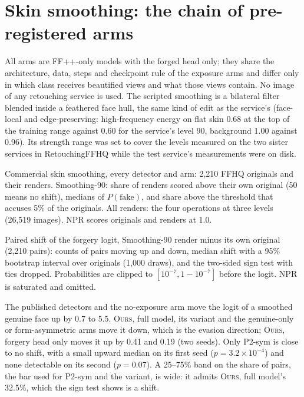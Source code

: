 \documentclass[10pt]{article}
\newcommand{\oursB}{\textsc{Ours}, forgery head only}
\newcommand{\oursF}{\textsc{Ours}, full model}
\begin{document}
\section{Skin smoothing: the chain of pre-registered arms}
\label{sec:chain}
All arms are FF++-only models with the forged head only; they share the architecture, data, steps and checkpoint rule of the
exposure arms and differ only in which class receives beautified views and what those views contain. No image of any retouching
service is used. The scripted smoothing is a bilateral filter blended inside a feathered face hull, the same kind of edit as the
service's (face-local and edge-preserving: high-frequency energy on flat skin 0.68 at the top of the training range against 0.60
for the service's level 90, background 1.00 against 0.96). Its strength range was set to cover the levels measured on the two
sister services in RetouchingFFHQ while the test service's measurements were on disk.

\begin{table}[H]
\centering
\caption{Commercial skin smoothing, every detector and arm: 2,210 FFHQ originals and their renders. Smoothing-90: share of renders
scored above their own original (50 means no shift), medians of $P(\text{fake})$, and share above the threshold that accuses 5\% of
the originals. All renders: the four operations at three levels (26,519 images). NPR scores originals and renders at 1.0.}
\label{tab:v4retouch}\label{tab:retouch}
\scriptsize
\begin{adjustbox}{max width=\linewidth}\end{adjustbox}
\end{table}
\begin{table}[H]
\centering
\caption{Paired shift of the forgery logit, Smoothing-90 render minus its own original (2,210 pairs): counts of pairs moving up and
down, median shift with a 95\% bootstrap interval over originals (1,000 draws), and the two-sided sign test with ties dropped.
Probabilities are clipped to $[10^{-7}, 1-10^{-7}]$ before the logit. NPR is saturated and omitted.}
\label{tab:shiftall}
\footnotesize

\end{table}
The published detectors and the no-exposure arm move the logit of a smoothed genuine face up by 0.7 to 5.5. \oursF{}, its variant
and the genuine-only or form-asymmetric arms move it down, which is the evasion direction; \oursB{} moves it up by 0.41 and 0.19
(two seeds). Only P2-sym is close to no shift, with a small upward median on its first seed ($p=3.2\times10^{-4}$) and none detectable on
its second ($p=0.07$). A 25--75\% band on the share of pairs, the bar used for P2-sym and the variant, is wide: it admits \oursF{}'s
32.5\%, which the sign test shows is a shift.
\end{document}
